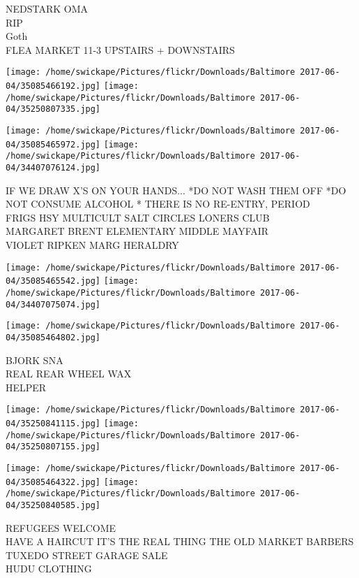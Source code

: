 \documentclass[10pt,letterpaper]{article}
\begin{document}
NEDSTARK OMA\\
RIP\\
Goth\\
FLEA MARKET 11{-}3 UPSTAIRS + DOWNSTAIRS\\
\pagebreak

\texttt{[image: /home/swickape/Pictures/flickr/Downloads/Baltimore 2017-06-04/35085466192.jpg]}
\texttt{[image: /home/swickape/Pictures/flickr/Downloads/Baltimore 2017-06-04/35250807335.jpg]}

\texttt{[image: /home/swickape/Pictures/flickr/Downloads/Baltimore 2017-06-04/35085465972.jpg]}
\texttt{[image: /home/swickape/Pictures/flickr/Downloads/Baltimore 2017-06-04/34407076124.jpg]}

IF WE DRAW X'S ON YOUR HANDS... *DO NOT WASH THEM OFF *DO NOT CONSUME ALCOHOL * THERE IS NO RE{-}ENTRY, PERIOD\\
FRIGS HSY MULTICULT SALT CIRCLES LONERS CLUB\\
MARGARET BRENT ELEMENTARY MIDDLE MAYFAIR\\
VIOLET RIPKEN MARG HERALDRY\\
\pagebreak

\texttt{[image: /home/swickape/Pictures/flickr/Downloads/Baltimore 2017-06-04/35085465542.jpg]}
\texttt{[image: /home/swickape/Pictures/flickr/Downloads/Baltimore 2017-06-04/34407075074.jpg]}

\vspace{0.25in}
\texttt{[image: /home/swickape/Pictures/flickr/Downloads/Baltimore 2017-06-04/35085464802.jpg]}

BJORK SNA\\
REAL REAR WHEEL WAX\\
HELPER\\
\pagebreak

\texttt{[image: /home/swickape/Pictures/flickr/Downloads/Baltimore 2017-06-04/35250841115.jpg]}
\texttt{[image: /home/swickape/Pictures/flickr/Downloads/Baltimore 2017-06-04/35250807155.jpg]}

\texttt{[image: /home/swickape/Pictures/flickr/Downloads/Baltimore 2017-06-04/35085464322.jpg]}
\texttt{[image: /home/swickape/Pictures/flickr/Downloads/Baltimore 2017-06-04/35250840585.jpg]}

REFUGEES WELCOME\\
HAVE A HAIRCUT IT'S THE REAL THING THE OLD MARKET BARBERS\\
TUXEDO STREET GARAGE SALE\\
HUDU CLOTHING\\
\pagebreak
\end{document}
